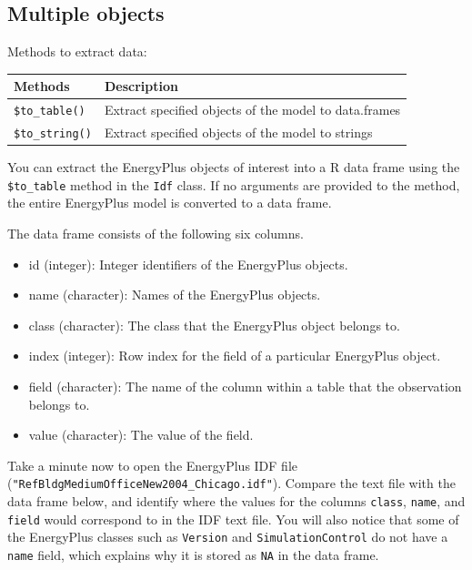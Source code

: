 \documentclass[
]{book}
\providecommand{\tightlist}{%
  \setlength{\itemsep}{0pt}\setlength{\parskip}{0pt}}
\begin{document}
\hypertarget{multiple-objects}{%
\subsection{Multiple objects}\label{multiple-objects}}

Methods to extract data:

\begin{longtable}[]{@{}ll@{}}
\toprule
Methods & Description \\
\midrule
\endhead
\texttt{\$to\_table()} & Extract specified objects of the model to data.frames \\
\texttt{\$to\_string()} & Extract specified objects of the model to strings \\
\bottomrule
\end{longtable}

You can extract the EnergyPlus objects of interest into a R data frame using the \texttt{\$to\_table} method in the \texttt{Idf} class. If no arguments are provided to the method, the entire EnergyPlus model is converted to a data frame.

The data frame consists of the following six columns.

\begin{itemize}
\tightlist
\item
  id (integer): Integer identifiers of the EnergyPlus objects.
\item
  name (character): Names of the EnergyPlus objects.
\item
  class (character): The class that the EnergyPlus object belongs to.
\item
  index (integer): Row index for the field of a particular EnergyPlus object.
\item
  field (character): The name of the column within a table that the observation belongs to.
\item
  value (character): The value of the field.
\end{itemize}

Take a minute now to open the EnergyPlus IDF file (\texttt{"RefBldgMediumOfficeNew2004\_Chicago.idf"}). Compare the text file with the data frame below, and identify where the values for the columns \texttt{class}, \texttt{name}, and \texttt{field} would correspond to in the IDF text file. You will also notice that some of the EnergyPlus classes such as \texttt{Version} and \texttt{SimulationControl} do not have a \texttt{name} field, which explains why it is stored as \texttt{NA} in the data frame.
\end{document}
